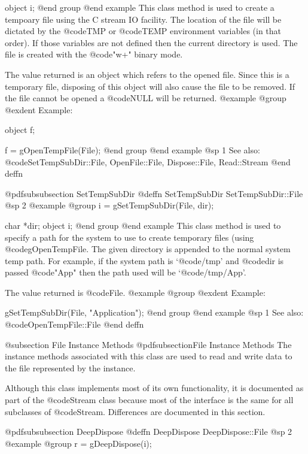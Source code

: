 object  i;
@end group
@end example
This class method is used to create a tempoary file using the C stream
IO facility.  The location of the file will be dictated by the
@code{TMP} or @code{TEMP} environment variables (in that order).  If
those variables are not defined then the current directory is used.  The
file is created with the @code{"w+"} binary mode.

The value returned is an object which refers to the opened file.  Since
this is a temporary file, disposing of this object will also cause the
file to be removed.  If the file cannot be opened a @code{NULL} will be
returned.
@example
@group
@exdent Example:

object  f;

f = gOpenTempFile(File);
@end group
@end example
@sp 1
See also:  @code{SetTempSubDir::File, OpenFile::File, Dispose::File, Read::Stream}
@end deffn







@pdfsubsubsection {SetTempSubDir}
@deffn {SetTempSubDir} SetTempSubDir::File
@sp 2
@example
@group
i = gSetTempSubDir(File, dir);

char  *dir;
object  i;
@end group
@end example
This class method is used to specify a path for the system to use to
create temporary files (using @code{gOpenTempFile}.  The given directory
is appended to the normal system temp path.  For example, if the system
path is `@code{/tmp}' and @code{dir} is passed @code{"App"} then the
path used will be `@code{/tmp/App}'.

The value returned is @code{File}.
@example
@group
@exdent Example:

gSetTempSubDir(File, "Application");
@end group
@end example
@sp 1
See also:  @code{OpenTempFile::File}
@end deffn





@subsection File Instance Methods
@pdfsubsection{File Instance Methods}
The instance methods associated with this class are used to read and write
data to the file represented by the instance.

Although this class implements most of its own functionality, it is
documented as part of the @code{Stream} class because most of the
interface is the same for all subclasses of @code{Stream}.  Differences
are documented in this section.





@pdfsubsubsection {DeepDispose}
@deffn {DeepDispose} DeepDispose::File
@sp 2
@example
@group
r = gDeepDispose(i);

